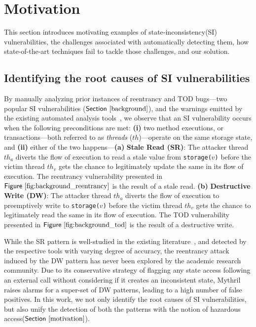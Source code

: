 \documentclass[conference, romanappendices]{tex/IEEEtran}
\theoremstyle{bfnote}
\newcommand{\reentrancy}{{reentrancy}\xspace}
\newcommand{\haz}{{hazardous access}\xspace}
\newcommand{\si}{{state-inconsistency}\xspace}
\newcommand{\mythril}{{\sc Mythril}\xspace}
\newcommand{\Fig}[1]{\ensuremath{\sf Figure~\ref{#1}}}
\newcommand{\Sect}[1]{\ensuremath{\sf Section~\ref{#1}}}
\begin{document}
 	\vspace{2mm}
\section{Motivation} 
\label{motivation}
This section introduces motivating examples of \si (SI) vulnerabilities, 
the challenges associated with automatically detecting them, how state-of-the-art techniques fail to tackle those challenges, and our solution.


\subsection{\textbf{Identifying the root causes of SI vulnerabilities}}
By manually analyzing prior instances of \reentrancy and TOD bugs---two popular SI vulnerabilities (\Sect{background}), and the warnings emitted by the existing automated analysis tools~\cite{sereum, mythril, securify, oyente}, we observe that an SI vulnerability occurs when the following preconditions are met:
\textbf{(i)} two method executions, or transactions---both referred to as \textit{threads} ($th$)---operate on the same storage state, and 
\textbf{(ii)} either of the two happens---\textbf{(a)} \textbf{Stale Read (SR)}: 
The attacker thread $th_a$ diverts the flow of execution to read a stale value from \texttt{storage($v$)} before the victim thread $th_v$ gets the chance to legitimately update the same in its flow of execution.
The \reentrancy vulnerability presented in \Fig{fig:background_reentrancy} is the result of a stale read.
\textbf{(b)} \textbf{Destructive Write (DW)}: 
The attacker thread $th_a$ diverts the flow of execution to preemptively write to \texttt{storage($v$)} before the victim thread $th_v$ gets the chance to legitimately read the same in its flow of execution.
The TOD vulnerability presented in \Fig{fig:background_tod} is the result of a destructive write.

While the SR pattern is well-studied in the existing literature~\cite{securify,sereum,oyente,vandal}, and detected by the respective tools with varying degree of accuracy, the \reentrancy attack induced by the DW pattern 
has never been explored by the academic research community.
Due to its conservative strategy of flagging any state access following an external call without considering if it creates an inconsistent state, \mythril raises alarms for a super-set of DW patterns, leading to a high number of false positives.
In this work, we not only identify the root causes of SI vulnerabilities, but also unify the detection of both the patterns with the notion of \haz (\Sect{motivation}).
\end{document}
